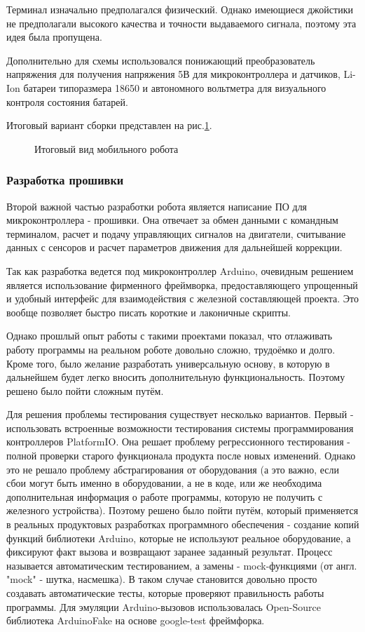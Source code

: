 \documentclass[14pt,a4paper,russian]{scrartcl}
\begin{document}
Терминал изначально предполагался физический. Однако имеющиеся джойстики
не предполагали высокого качества и точности выдаваемого сигнала, поэтому
эта идея была пропущена.

Дополнительно для схемы использовался понижающий преобразователь
напряжения для получения напряжения 5В для микроконтроллера и датчиков, 
Li-Ion батареи типоразмера 18650 и автономного вольтметра для 
визуального контроля состояния батарей.

Итоговый вариант сборки представлен на рис.\ref{fig:robocar_common_sight}.
\begin{figure}[h]
    \caption{Итоговый вид мобильного робота}
    \label{fig:robocar_common_sight}
\end{figure}

\subsubsection{Разработка прошивки}
Второй важной частью разработки робота является написание ПО для микроконтроллера 
- прошивки. Она отвечает за обмен данными с командным терминалом,
расчет и подачу управляющих сигналов на двигатели, считывание данных
с сенсоров и расчет параметров движения для дальнейшей коррекции.

Так как разработка ведется под микроконтроллер Arduino, очевидным
решением является использование фирменного фреймворка, 
предоставляющего упрощенный и удобный интерфейс для взаимодействия
с железной составляющей проекта. Это вообще позволяет быстро писать 
короткие и лаконичные скрипты.

Однако прошлый опыт работы с такими проектами показал, что отлаживать 
работу программы на реальном роботе довольно сложно, трудоёмко и долго.
Кроме того, было желание разработать универсальную основу, в которую
в дальнейшем будет легко вносить дополнительную функциональность. Поэтому
решено было пойти сложным путём.

Для решения проблемы тестирования существует несколько вариантов. 
Первый - использовать встроенные возможности тестирования системы
программирования контроллеров PlatformIO. Она решает проблему регрессионного
тестирования - полной проверки старого функционала продукта после новых изменений.
Однако это не решало проблему абстрагирования от оборудования (а это важно, если
сбои могут быть именно в оборудовании, а не в коде, или же необходима
дополнительная информация о работе программы, которую не получить с железного
устройства). Поэтому решено было пойти путём, который применяется в реальных
продуктовых разработках программного обеспечения - создание копий функций
библиотеки Arduino, которые не используют реальное оборудование, а 
фиксируют факт вызова и возвращают заранее заданный результат. Процесс называется
автоматическим тестированием, а замены - mock-функциями (от англ. "mock" - шутка, насмешка).
В таком случае становится довольно просто создавать автоматические тесты,
которые проверяют правильность работы программы. Для эмуляции Arduino-вызовов
использовалась Open-Source библиотека ArduinoFake на основе google-test фреймфорка.
\end{document}
